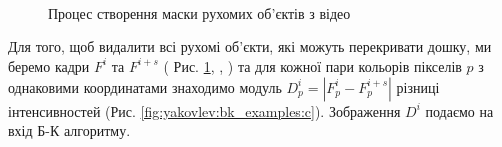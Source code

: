 \begin{figure}[H]
	\centering
	\\
	\\
	\\	
	\caption{Процес створення маски рухомих об'єктів з відео \cite{yakovlev_discrete_math_video}
		\label{fig:yakovlev:bk_examples}
	}
  \end{figure}

Для того, щоб видалити всі рухомі об'єкти, які можуть перекривати дошку, ми
беремо кадри \(F^{i}\) та \(F^{i + s}\)  ( Рис. \ref{fig:yakovlev:bk_examples},
,
) та для
кожної пари кольорів пікселів \(p\) з однаковими координатами знаходимо
модуль \(D_{p}^{i} = \left| F_{p}^{i} - F_{p}^{i + s} \right|\) різниці
інтенсивностей (Рис. \ref{fig:yakovlev:bk_examples:c}). Зображення \(D^{i}\) подаємо на вхід
Б-К алгоритму.

